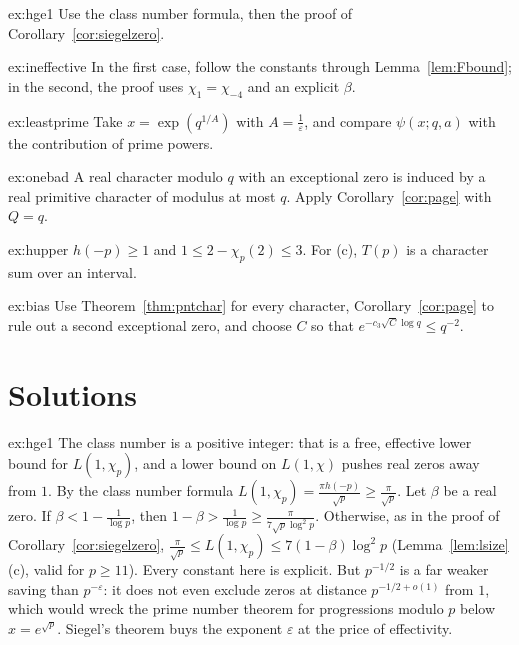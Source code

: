 \begin{hint}{ex:hge1}
Use the class number formula, then the proof of Corollary~\ref{cor:siegelzero}.
\end{hint}

\begin{hint}{ex:ineffective}
In the first case, follow the constants through Lemma~\ref{lem:Fbound}; in the second, the proof uses $\chi_1=\chi_{-4}$ and an explicit $\beta$.
\end{hint}

\begin{hint}{ex:leastprime}
Take $x=\exp(q^{1/A})$ with $A=\frac1\varepsilon$, and compare $\psi(x;q,a)$ with the contribution of prime powers.
\end{hint}

\begin{hint}{ex:onebad}
A real character modulo $q$ with an exceptional zero is induced by a real primitive character of modulus at most $q$. Apply Corollary~\ref{cor:page} with $Q=q$.
\end{hint}

\begin{hint}{ex:hupper}
$h(-p)\ge1$ and $1\le2-\chi_p(2)\le3$. For (c), $T(p)$ is a character sum over an interval.
\end{hint}

\begin{hint}{ex:bias}
Use Theorem~\ref{thm:pntchar} for every character, Corollary~\ref{cor:page} to rule out a second exceptional zero, and choose $C$ so that $e^{-c_3\sqrt C\log q}\le q^{-2}$.
\end{hint}

\section{Solutions}

\begin{solution}{ex:hge1}
\idea The class number is a positive integer: that is a free, effective lower bound for $L(1,\chi_p)$, and a lower bound on $L(1,\chi)$ pushes real zeros away from $1$.
\writeup By the class number formula $L(1,\chi_p)=\frac{\pi h(-p)}{\sqrt p}\ge\frac\pi{\sqrt p}$. Let $\beta$ be a real zero. If $\beta<1-\frac1{\log p}$, then $1-\beta>\frac1{\log p}\ge\frac\pi{7\sqrt p\log^2p}$. Otherwise, as in the proof of Corollary~\ref{cor:siegelzero}, $\frac\pi{\sqrt p}\le L(1,\chi_p)\le7(1-\beta)\log^2p$ (Lemma~\ref{lem:lsize}(c), valid for $p\ge11$).
Every constant here is explicit. But $p^{-1/2}$ is a far weaker saving than $p^{-\varepsilon}$: it does not even exclude zeros at distance $p^{-1/2+o(1)}$ from $1$, which would wreck the prime number theorem for progressions modulo $p$ below $x=e^{\sqrt p}$. Siegel's theorem buys the exponent $\varepsilon$ at the price of effectivity.
\end{solution}

